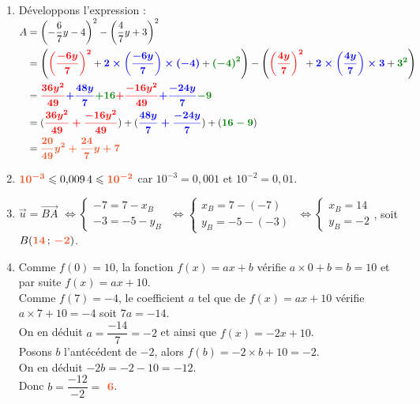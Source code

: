 \documentclass[a4paper,11pt]{article}
\newcounter{seancenum}
\newcounter{seancenumD}
\begin{document}
\setcounter{seancenumD}{20}
\newpage
\begin{seanceD}{} %

\begin{enumerate}
\item Développons l'expression :\\
 $\begin{aligned}A &=\left(-\dfrac{6}{7}y-4\right)^2-\left(\dfrac{4}{7}y+3\right)^2\\&=\left({\color{red}\boldsymbol{\left( \dfrac{-6y}{7}\right) ^2}}+{\color{blue}\boldsymbol{2\times \left( \dfrac{-6y}{7}\right) \times \left( -4\right) }}+{\color[HTML]{008002}\boldsymbol{\left( -4\right) ^2}}\right)-\left({\color{red}\boldsymbol{\left( \dfrac{4y}{7}\right) ^2}}+{\color{blue}\boldsymbol{2\times \left( \dfrac{4y}{7}\right) \times 3}}+{\color[HTML]{008002}\boldsymbol{3^2}}\right)\\&={\color{red}\boldsymbol{\frac{36y^2}{49}}}{\color{blue}\boldsymbol{+\frac{48y}{7}}}{\color[HTML]{008002}\boldsymbol{+16}}{\color{red}\boldsymbol{+\frac{-16y^2}{49}}}{\color{blue}\boldsymbol{+\frac{-24y}{7}}}{\color[HTML]{008002}\boldsymbol{-9}}\\&=({\color{red}\boldsymbol{\frac{36y^2}{49}+\frac{-16y^2}{49}}})+({\color{blue}\boldsymbol{\frac{48y}{7}+\frac{-24y}{7}}})+({\color[HTML]{008002}\boldsymbol{16-9}})\\&={\color[HTML]{f15929}\boldsymbol{\dfrac{20}{49}y^2+\dfrac{24}{7}y+7}}\end{aligned}$

\item  ${\color[HTML]{f15929}\boldsymbol{10^{-3}}} \leqslant 0{,}009\,4 \leqslant {\color[HTML]{f15929}\boldsymbol{10^{-2}}}$ car $10^{-3} = 0{,}001$ et $10^{-2} = 0{,}01.$

\item  $\overrightarrow{u}=\overrightarrow{BA}$ $\Leftrightarrow\begin{cases}-7=7-x_B\\-3=-5-y_B\end{cases}$ $\Leftrightarrow\begin{cases}x_B=7-(-7)\\y_B=-5-(-3)\end{cases}$ $\Leftrightarrow\begin{cases}x_B=14\\y_B=-2\end{cases}$, soit $B({\color[HTML]{f15929}\boldsymbol{14}}\,;\,{\color[HTML]{f15929}\boldsymbol{-2}})$.

\item  Comme $f(0)=10$, la fonction $f(x)=ax+b$ vérifie $a\times 0 + b = b = 10$ et par suite $f(x)=ax+10$.\\Comme $f(7)=-4$, le coefficient $a$ tel que de $f(x)=ax+10$ vérifie $a\times 7+10 = -4$ soit $7a=-14$.\\On en déduit $a=\dfrac{-14}{7}=-2$ et ainsi que $f(x)=-2x+10$.\\Posons $b$ l'antécédent de $-2$, alors $f(b)=-2\times b+10=-2$.\\On en déduit $-2b=-2-10=-12$.\\Donc $b=\dfrac{-12}{-2}=$ ${\color[HTML]{f15929}\boldsymbol{6}}$.


\end{enumerate}
\end{seanceD}
\end{document}
